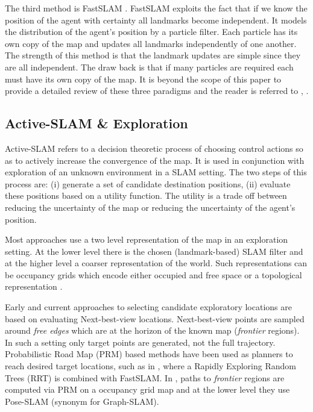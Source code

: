 The third method is FastSLAM \cite{FastSLAM}. FastSLAM exploits the fact that if we know the position of the agent with 
certainty all landmarks become independent. It models the distribution of the agent's position by a particle filter. Each particle
has its own copy of the map and updates all landmarks independently of one another. The strength of this method is that the landmark
updates are simple since they are all independent. The draw back is that if many particles are required each must have its own copy of the map. 
It is beyond the scope of this paper to provide a detailed review of these  three paradigms and the reader is referred to \cite{Thrun_Burgard_Fox_2005}, \cite{SLAM_HBR}.

\subsection{Active-SLAM \& Exploration}

Active-SLAM refers to a decision theoretic process of choosing control actions so as to actively 
increase the convergence of the map. It is used in conjunction with exploration of an unknown environment
in a SLAM setting. The two steps of this process are: (i) generate a set of 
candidate destination positions, (ii) evaluate these positions based on a utility function. The utility  
is a trade off between reducing the uncertainty of the map or reducing the uncertainty
of the agent's position.

Most approaches use a two level representation of the map in an exploration setting. At the lower level
there is the chosen (landmark-based) SLAM filter and at the higher level a coarser representation of the world.
Such representations can be occupancy grids \cite{Thrun_grid_based_1996} which encode either occupied and free space
or a topological representation \cite{Kollar_2008_Exploration_SLAM}.

Early and current approaches to selecting candidate exploratory locations are based on evaluating 
Next-best-view \cite{Navigation_strategires_for_exploring_indoor_environments} locations. Next-best-view points are 
sampled around \textit{free edges} which are at the horizon of the known map (\textit{frontier} regions). 
In such a setting only target points are generated, not the full trajectory. Probabilistic Road Map (PRM) \cite{PRM_1996}
based methods have been used as planners to reach desired target locations, such as in \cite{RRT-SLAM}, where a Rapidly
Exploring Random Trees (RRT) is combined with FastSLAM. In \cite{ActivePosSLAM}, paths to \textit{frontier} regions are computed
via PRM  on a occupancy grid map and at the lower level they use Pose-SLAM (synonym for Graph-SLAM).

